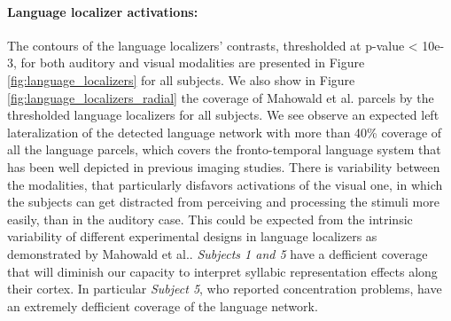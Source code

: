 \paragraph{Language localizer activations:}
The contours of the language localizers' contrasts, thresholded at p-value < 10e-3, for both auditory and visual modalities are presented in Figure \ref{fig:language_localizers} for all subjects.
We also show in Figure \ref{fig:language_localizers_radial} the coverage of Mahowald et al. parcels\citep{mahowald2016reliable} by the thresholded language localizers for all subjects.
We see observe an expected left lateralization of the detected language network with more than 40\% coverage of all the language parcels, which covers the fronto-temporal language system that has been well depicted in previous imaging studies\citep{mahowald2016reliable, fedorenko2010new, dehaene2010learning, binder1997human}.
There is variability between the modalities, that particularly disfavors activations of the visual one, in which the subjects can get distracted from perceiving and processing the stimuli more easily, than in the auditory case.
This could be expected from the intrinsic variability of different experimental designs in language localizers as demonstrated by Mahowald et al.\citep{mahowald2016reliable}.
\emph{Subjects 1 and 5} have a defficient coverage that will diminish our capacity to interpret syllabic representation effects along their cortex.
In particular \emph{Subject 5}, who reported concentration problems, have an extremely defficient coverage of the language network.

